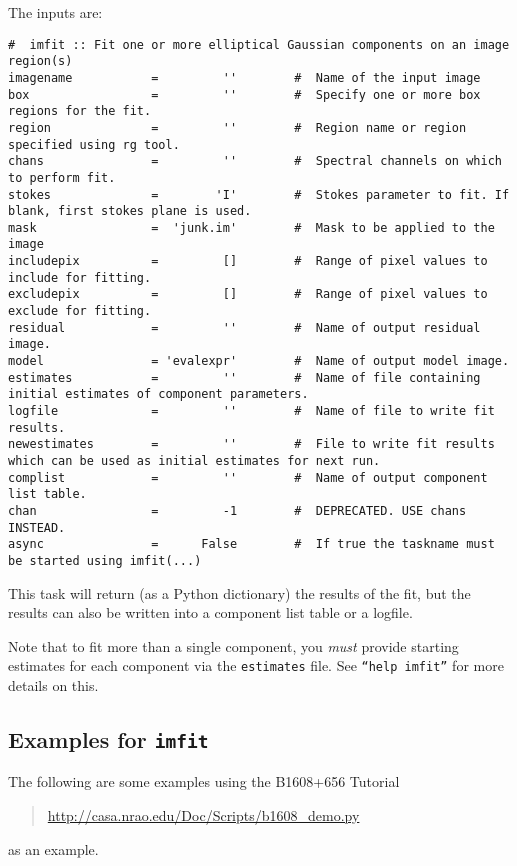 The inputs are:
\small
\begin{verbatim}
#  imfit :: Fit one or more elliptical Gaussian components on an image region(s)
imagename           =         ''        #  Name of the input image
box                 =         ''        #  Specify one or more box regions for the fit.
region              =         ''        #  Region name or region specified using rg tool.
chans               =         ''        #  Spectral channels on which to perform fit.
stokes              =        'I'        #  Stokes parameter to fit. If blank, first stokes plane is used.
mask                =  'junk.im'        #  Mask to be applied to the image
includepix          =         []        #  Range of pixel values to include for fitting.
excludepix          =         []        #  Range of pixel values to exclude for fitting.
residual            =         ''        #  Name of output residual image.
model               = 'evalexpr'        #  Name of output model image.
estimates           =         ''        #  Name of file containing initial estimates of component parameters.
logfile             =         ''        #  Name of file to write fit results.
newestimates        =         ''        #  File to write fit results which can be used as initial estimates for next run.
complist            =         ''        #  Name of output component list table.
chan                =         -1        #  DEPRECATED. USE chans INSTEAD.
async               =      False        #  If true the taskname must be started using imfit(...)

\end{verbatim}
\normalsize
This task will return (as a Python dictionary) the results of the fit,
but the results can also be written into a component list table or a
logfile. 
 
Note that to fit more than a single component, you {\em must} provide
starting estimates for each component via the {\tt estimates} file.
See {\tt ``help imfit''} for more details on this.

\subsection{Examples for {\tt imfit}}
\label{section:analysis.imfit.examples}

The following are some examples using the B1608+656 Tutorial
\begin{quote}
  \url{http://casa.nrao.edu/Doc/Scripts/b1608_demo.py}
\end{quote}
as an example.

